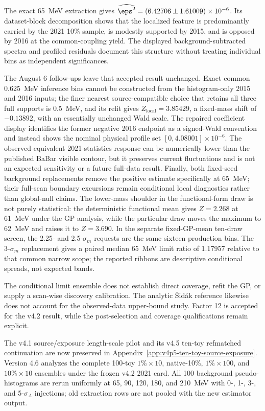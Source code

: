The exact 65~MeV extraction gives
$\widehat{\eps^2}=(6.42706\pm1.61009)\times10^{-6}$. Its dataset-block
decomposition shows that the localized feature is predominantly carried by the
2021 10\% sample, is modestly supported by 2015, and is opposed by 2016 at the
common-coupling yield. The displayed background-subtracted spectra and profiled
residuals document this structure without treating individual bins as independent
significances.

The August 6 follow-ups leave that accepted result unchanged.  Exact common
0.625~MeV inference bins cannot be constructed from the histogram-only 2015 and
2016 inputs; the finer nearest source-compatible choice that retains all three
full supports is 0.5~MeV, and its refit gives
$Z_{\mathrm{local}}=3.85429$, a fixed-mass shift of $-0.13892$, with an
essentially unchanged Wald scale.  The repaired coefficient display identifies
the former negative 2016 endpoint as a signed-Wald convention and instead shows
the nominal physical profile set $[0,4.08001]\times10^{-6}$.  The
observed-equivalent 2021-statistics response can be numerically lower than the
published BaBar visible contour, but it preserves current fluctuations and is
not an expected sensitivity or a future full-data result.  Finally, both
fixed-seed background replacements remove the positive estimate specifically
at 65~MeV; their full-scan boundary excursions remain conditional local
diagnostics rather than global-null claims.  The lower-mass shoulder in the
functional-form draw is not purely statistical: the deterministic functional
mean gives $Z=2.268$ at 61~MeV under the GP analysis, while the particular
draw moves the maximum to 62~MeV and raises it to $Z=3.690$.  In the separate
fixed-GP-mean ten-draw screen, the 2.25- and 2.5-$\sigma_m$ requests are the
same sixteen production bins.  The 3-$\sigma_m$ replacement gives a paired
median 65~MeV limit ratio of 1.17957 relative to that common narrow scope; the
reported ribbons are descriptive conditional spreads, not expected bands.

The conditional limit ensemble does not establish direct \CLs{} coverage, refit
the GP, or supply a scan-wise discovery calibration. The analytic \v{S}id\'ak
reference likewise does not account for the observed-data upper-bound study.
Factor 12 is accepted for the v4.2 result, while the post-selection and coverage
qualifications remain explicit.

The v4.1 source/exposure length-scale pilot and its v4.5 ten-toy refmatched
continuation are now preserved in Appendix~\ref{app:v4p5-ten-toy-source-exposure}.
Version 4.6 analyzes the complete 100-toy $1\%\times10$, native-10\%,
$1\%\times100$, and $10\%\times10$ ensembles under the frozen v4.2 2021 card.
All 100 background pseudo-histograms are rerun uniformly at 65, 90, 120, 180,
and 210~MeV with 0-, 1-, 3-, and 5-$\sigma_A$ injections; old extraction rows
are not pooled with the new estimator output.

